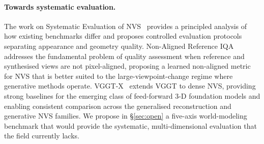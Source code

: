 \paragraph{Towards systematic evaluation.}
The work on Systematic Evaluation of NVS~\citep{chen2024sysnvs} provides
a principled analysis of how existing benchmarks differ and proposes
controlled evaluation protocols separating appearance and geometry quality.
Non-Aligned Reference IQA~\citep{zhang2024nariqanvs} addresses the fundamental
problem of quality assessment when reference and synthesised views are not
pixel-aligned, proposing a learned non-aligned metric for NVS that is
better suited to the large-viewpoint-change regime where generative methods
operate.
VGGT-X~\citep{liu2025vggtx} extends VGGT to dense NVS, providing strong
baselines for the emerging class of feed-forward 3-D foundation models
and enabling consistent comparison across the generalised reconstruction
and generative NVS families.
We propose in \S\ref{sec:open} a five-axis world-modeling benchmark that
would provide the systematic, multi-dimensional evaluation that the field
currently lacks.

